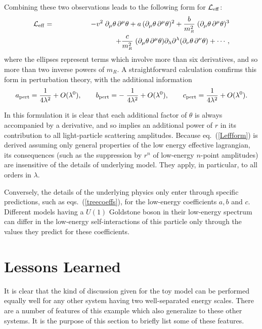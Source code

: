 \documentclass[12pt]{article}
\def\sst{\scriptscriptstyle}
\def\pref#1{(\ref{#1})}
\begin{document}
Combining these two observations leads to the following
form for ${\cal L}_{\rm eff}$:
%
\begin{eqnarray}
\label{Leffform}
{\cal L}_{\rm eff} &=& - v^2 \; \partial_\mu \theta \, \partial^\mu \theta
+ a \, (\partial_\mu \theta \, \partial^\mu \theta)^2 
+ {b \over m_{\sst R}^2} \; (\partial_\mu \theta \, \partial^\mu \theta)^3
\nonumber\\
&& \qquad\qquad\qquad\qquad
+ {c \over m_{\sst R}^2} \; (\partial_\mu \theta \, \partial^\mu \theta)
\partial_\lambda \partial^\lambda
(\partial_\nu \theta \, \partial^\nu \theta) + \cdots,
\end{eqnarray}
%
where the ellipses represent terms which involve more than
six derivatives, and so more than two inverse powers of 
$m_{\sst R}$. A straightforward calculation comfirms this form in 
perturbation theory, with the additional information
%
\begin{equation}
\label{treecoeffs}
a_{\rm pert} = {1 \over 4 \lambda^2} + O(\lambda^0),
\qquad b_{\rm pert} = - \; {1 \over 4 \lambda^2} + O(\lambda^0),
\qquad c_{\rm pert} = {1 \over 4 \lambda^2}  + O(\lambda^0).
\end{equation}

In this formulation it is clear that each additional factor of 
$\theta$ is always accompanied by a derivative, 
and so implies an additional power of $r$ in its contribution 
to all light-particle scattering amplitudes. Because 
eq.~\pref{Leffform} is derived assuming only general properties of the
low energy effective lagrangian, its consequences (such as the
suppression by $r^n$ of low-energy $n$-point amplitudes) are
insensitive of the details of underlying model. They apply, in 
particular, to all orders in $\lambda$.

Conversely, the details of the underlying physics only enter 
through specific predictions, such as eqs.~\pref{treecoeffs}, 
for the low-energy coefficients $a,b$ and $c$. Different
models having a $U(1)$ Goldstone boson in their low-energy
spectrum can differ in the low-energy self-interactions of this
particle only through the values they predict for these
coefficients. 

\section{Lessons Learned}

It is clear that the kind of discussion given for the
toy model can be performed equally well for any other 
system having two well-separated energy scales.
There are a number of features of this example which
also generalize to these other systems. It is the purpose
of this section to briefly list some of these features.
\end{document}
